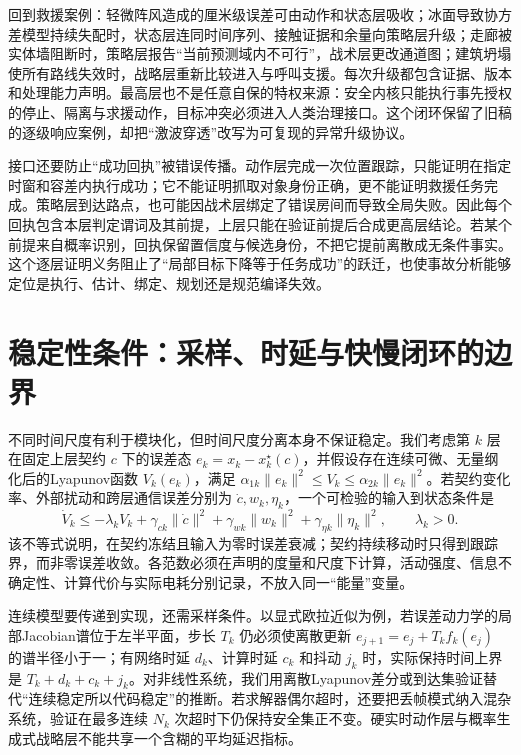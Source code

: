 回到救援案例：轻微阵风造成的厘米级误差可由动作和状态层吸收；冰面导致协方差模型持续失配时，状态层连同时间序列、接触证据和余量向策略层升级；走廊被实体墙阻断时，策略层报告“当前预测域内不可行”，战术层更改通道图；建筑坍塌使所有路线失效时，战略层重新比较进入与呼叫支援。每次升级都包含证据、版本和处理能力声明。最高层也不是任意自保的特权来源：安全内核只能执行事先授权的停止、隔离与求援动作，目标冲突必须进入人类治理接口。这个闭环保留了旧稿的逐级响应案例，却把“激波穿透”改写为可复现的异常升级协议。

接口还要防止“成功回执”被错误传播。动作层完成一次位置跟踪，只能证明在指定时窗和容差内执行成功；它不能证明抓取对象身份正确，更不能证明救援任务完成。策略层到达路点，也可能因战术层绑定了错误房间而导致全局失败。因此每个回执包含本层判定谓词及其前提，上层只能在验证前提后合成更高层结论。若某个前提来自概率识别，回执保留置信度与候选身份，不把它提前离散成无条件事实。这个逐层证明义务阻止了“局部目标下降等于任务成功”的跃迁，也使事故分析能够定位是执行、估计、绑定、规划还是规范编译失效。

\section{稳定性条件：采样、时延与快慢闭环的边界}
\label{sec:time_scale_separation_and_adiabatic_approximation}

不同时间尺度有利于模块化，但时间尺度分离本身不保证稳定。我们考虑第 $k$ 层在固定上层契约 $c$ 下的误差态 $e_k=x_k-x_k^\star(c)$，并假设存在连续可微、无量纲化后的Lyapunov函数 $V_k(e_k)$，满足 $\alpha_{1k}\|e_k\|^2\leq V_k\leq\alpha_{2k}\|e_k\|^2$。若契约变化率、外部扰动和跨层通信误差分别为 $\dot c,w_k,\eta_k$，一个可检验的输入到状态条件是
\begin{equation}
 \dot V_k\leq-\lambda_k V_k
 +\gamma_{ck}\|\dot c\|^2
 +\gamma_{wk}\|w_k\|^2
 +\gamma_{\eta k}\|\eta_k\|^2,
 \qquad \lambda_k>0.
\end{equation}
该不等式说明，在契约冻结且输入为零时误差衰减；契约持续移动时只得到跟踪界，而非零误差收敛。各范数必须在声明的度量和尺度下计算，活动强度、信息不确定性、计算代价与实际电耗分别记录，不放入同一“能量”变量。

连续模型要传递到实现，还需采样条件。以显式欧拉近似为例，若误差动力学的局部Jacobian谱位于左半平面，步长 $T_k$ 仍必须使离散更新 $e_{j+1}=e_j+T_k f_k(e_j)$ 的谱半径小于一；有网络时延 $d_k$、计算时延 $c_k$ 和抖动 $j_k$ 时，实际保持时间上界是 $T_k+d_k+c_k+j_k$。对非线性系统，我们用离散Lyapunov差分或到达集验证替代“连续稳定所以代码稳定”的推断。若求解器偶尔超时，还要把丢帧模式纳入混杂系统，验证在最多连续 $N_k$ 次超时下仍保持安全集正不变。硬实时动作层与概率生成式战略层不能共享一个含糊的平均延迟指标。

